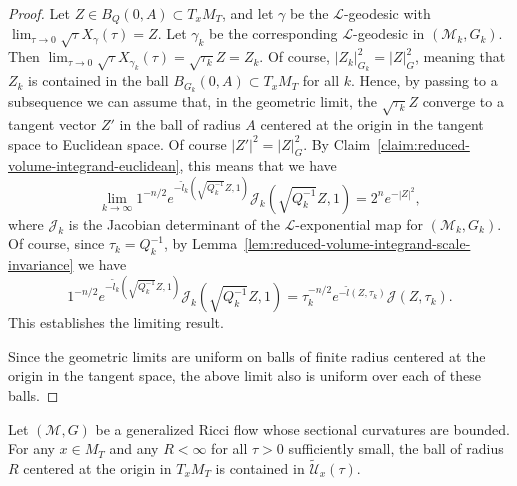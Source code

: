 \begin{proof}
Let $Z\in B_Q(0,A)\subset T_xM_T$, and let $\gamma$ be the
${\mathcal L}$-geodesic with $\lim_{\tau\rightarrow
0}\sqrt{\tau}X_\gamma(\tau)=Z$. Let $\gamma_k$ be the corresponding
${\mathcal L}$-geodesic in $({\mathcal M}_k,G_k)$. Then $\lim_{\tau\rightarrow
0}\sqrt{\tau}X_{\gamma_k}(\tau)=\sqrt{\tau_k}Z=Z_k$. Of course,
$|Z_k|^2_{G_k}=|Z|^2_G$, meaning that $Z_k$ is contained in the ball
$B_{G_k}(0,A)\subset T_xM_T$ for all $k$. Hence, by passing to a
subsequence we can assume that, in the geometric limit, the
$\sqrt{\tau_k}Z$ converge to a tangent vector $Z'$ in the ball of
radius $A$ centered at the origin in the tangent space to Euclidean
space. Of course $|Z'|^2=|Z|_G^2$. By Claim~\ref{claim:reduced-volume-integrand-euclidean}, this
means that we have
$$\lim_{k\rightarrow \infty}1^{-n/2}e^{-\tilde l_k(\sqrt{Q_k^{-1}}Z,1)}{\mathcal
J}_k(\sqrt{Q_k^{-1}}Z,1)=2^ne^{-|Z|^2},$$ where ${\mathcal J}_k$ is
the Jacobian determinant of the ${\mathcal L}$-exponential map for
$({\mathcal M}_k,G_k)$.
 Of course, since
$\tau_k=Q_k^{-1}$, by Lemma~\ref{lem:reduced-volume-integrand-scale-invariance} we have
$$1^{-n/2}e^{-\tilde l_k(\sqrt{Q_k^{-1}}Z,1)}{\mathcal
J}_k(\sqrt{Q_k^{-1}}Z,1)=\tau_k^{-n/2}e^{-\tilde
l(Z,\tau_k)}{\mathcal J}(Z,\tau_k).$$ This establishes the limiting
result.

Since the geometric limits are uniform on balls of finite radius
centered at the origin in the tangent space, the above limit also is
uniform over each of these balls.
\end{proof}

\begin{corollary}\label{cor:injectivity-set-contains-ball-small-tau}
\label{Jlimit1}

Let $({\mathcal M},G)$ be a generalized Ricci flow whose sectional
curvatures are bounded. For any $x\in M_T$ and any $R<\infty$ for
all $\tau>0$ sufficiently small, the ball of radius $R$ centered at
the origin in $T_xM_T$ is contained in $\widetilde {\mathcal
U}_x(\tau)$.
\end{corollary}



